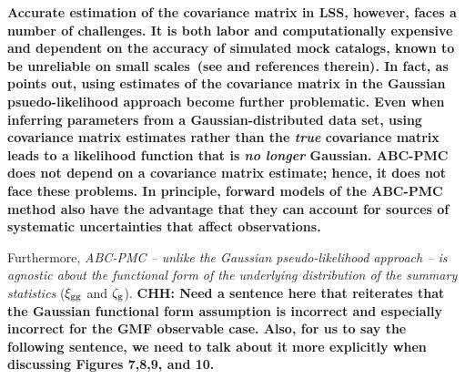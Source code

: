 \documentclass[fleqn,usenatbib]{mnras}
\begin{document}
{\bf \color{dred} 
Accurate estimation of the covariance matrix 
in LSS, however, faces a number of challenges. It is both labor and computationally 
expensive and dependent on the accuracy of simulated mock catalogs, known to be 
unreliable on small scales~(see \citealt{cosmiccode,nifty} and references therein). 
In fact, as \cite{Sellentin:2016a} points out, using estimates of the covariance 
matrix in the Gaussian psuedo-likelihood approach become further problematic. Even 
when inferring parameters from a Gaussian-distributed data set, using covariance 
matrix estimates rather than the {\em true} covariance matrix leads to a likelihood 
function that is {\em no longer} Gaussian.
ABC-PMC does not depend on a covariance matrix estimate; hence, it does not face 
these problems. In principle, forward models of the ABC-PMC method also have the 
advantage that they can account for sources of systematic uncertainties that affect 
observations.
}

Furthermore, {\em ABC-PMC -- unlike the Gaussian pseudo-likelihood approach -- 
is agnostic about the functional form of the underlying distribution of the 
summary statistics} 
($\xi_{\mathrm{gg}}$ and $\mathcal{\zeta}_{\rm g}$). 
{\bf \color{darkgreen}
CHH: Need a sentence here that reiterates that the Gaussian functional form 
assumption is incorrect and especially incorrect for the GMF observable case.
Also, for us to say the following sentence, we need to talk about it more explicitly 
when discussing Figures 7,8,9, and 10. 
}
\end{document}
